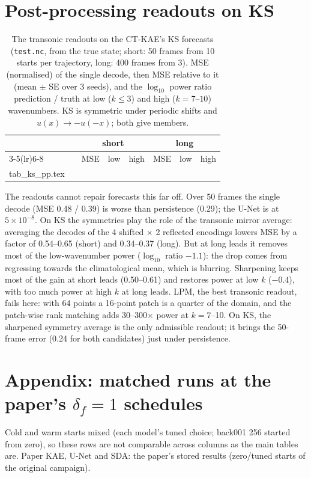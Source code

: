 \documentclass[10pt]{article}
\begin{document}
\section*{Post-processing readouts on KS}
\begin{table}[!htbp]
\centering\scriptsize
\caption{The transonic readouts on the CT-KAE's KS forecasts (\texttt{test.nc}, from the true
state; short: 50 frames from 10 starts per trajectory, long: 400 frames from 3). MSE (normalised)
of the single decode, then MSE relative to it (mean $\pm$ SE over 3 seeds), and the $\log_{10}$
power ratio prediction / truth at low ($k \le 3$) and high ($k = 7$--$10$) wavenumbers. KS is
symmetric under periodic shifts and $u(x) \to -u(-x)$; both give members.}
\label{tab:kspp}
\begin{tabular}{llcccccc}
\toprule
 & & \multicolumn{3}{c}{short} & \multicolumn{3}{c}{long}\\
\cmidrule(lr){3-5}\cmidrule(lr){6-8}
 & & MSE & low & high & MSE & low & high\\
\midrule
{} tab_ks_pp.tex
\bottomrule
\end{tabular}
\end{table}

The readouts cannot repair forecasts this far off. Over 50 frames the single decode (MSE 0.48 /
0.39) is worse than persistence (0.29); the U-Net is at $5\times10^{-8}$. On KS the symmetries play
the role of the transonic mirror average: averaging the decodes of the 4 shifted $\times$ 2
reflected encodings lowers MSE by a factor of 0.54--0.65 (short) and 0.34--0.37 (long). But at long
leads it removes most of the low-wavenumber power ($\log_{10}$ ratio $-1.1$): the drop comes from
regressing towards the climatological mean, which is blurring. Sharpening keeps most of the gain
at short leads (0.50--0.61) and restores power at low $k$ ($-0.4$), with too much power at high $k$
at long leads. LPM, the best transonic readout, fails here: with 64 points a 16-point patch is a
quarter of the domain, and the patch-wise rank matching adds 30--300$\times$ power at $k = 7$--10. On
KS, the sharpened symmetry average is the only admissible readout; it brings the 50-frame error
(0.24 for both candidates) just under persistence.

\clearpage
\section*{Appendix: matched runs at the paper's $\delta_f = 1$ schedules}
Cold and warm starts mixed (each model's tuned choice; back001 256 started from zero), so these rows are not comparable across columns as the main tables are. Paper KAE, U-Net and SDA: the paper's stored results (zero/tuned starts of the original campaign).
\end{document}
